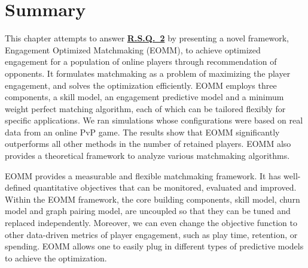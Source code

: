 \section{Summary}
This chapter attempts to answer \hyperref[rq2]{\textbf{R.S.Q.~2}} by presenting a novel framework, Engagement Optimized Matchmaking (EOMM), to achieve optimized engagement for a population of online players through recommendation of opponents. It formulates matchmaking as a problem of maximizing the player engagement, and solves the optimization efficiently. EOMM employs three components, a skill model, an engagement predictive model and a minimum weight perfect matching algorithm, each of which can be tailored flexibly for specific applications. We ran simulations whose configurations were based on real data from an online PvP game. The results show that EOMM significantly outperforms all other methods in the number of retained players. EOMM also provides a theoretical framework to analyze various matchmaking algorithms.

EOMM provides a measurable and flexible matchmaking framework. It has well-defined quantitative objectives that can be monitored, evaluated and improved. Within the EOMM framework, the core building components, skill model, churn model and graph pairing model, are uncoupled so that they can be tuned and replaced independently. Moreover, we can even change the objective function to other data-driven metrics of player engagement, such as play time, retention, or spending. EOMM allows one to easily plug in different types of predictive models to achieve the optimization.


